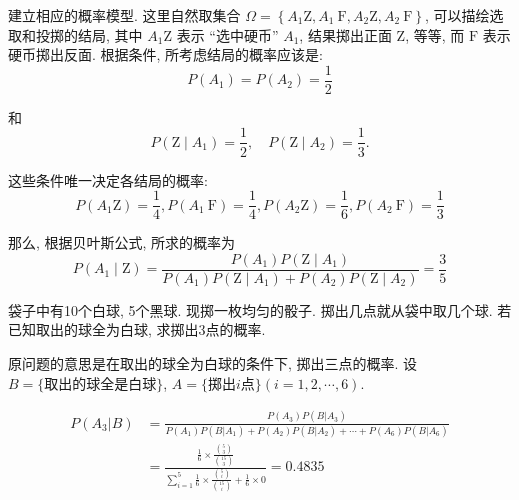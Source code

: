 \begin{solution}
    建立相应的概率模型. 这里自然取集合 $\Omega=\left\{A_1 \mathrm{Z}, A_1 \mathrm{~F}, A_2 \mathrm{Z}, A_2 \mathrm{~F}\right\}$, 可以描绘选取和投掷的结局, 其中 $A_1 \mathrm{Z}$ 表示 ``选中硬币'' $A_1$, 结果掷出正面 $\mathrm{Z}$, 等等, 而 $\mathrm{F}$ 表示硬币掷出反面. 根据条件, 所考虑结局的概率应该是:
$$
P\left(A_1\right)=P\left(A_2\right)=\frac{1}{2}
$$

和
$$
P\left(\mathrm{Z} \mid A_1\right)=\frac{1}{2}, \quad P\left(\mathrm{Z} \mid A_2\right)=\frac{1}{3} .
$$

这些条件唯一决定各结局的概率:
$$
P\left(A_1 \mathrm{Z}\right)=\frac{1}{4}, P\left(A_1 \mathrm{~F}\right)=\frac{1}{4}, P\left(A_2 \mathrm{Z}\right)=\frac{1}{6}, P\left(A_2 \mathrm{~F}\right)=\frac{1}{3}
$$

那么, 根据贝叶斯公式, 所求的概率为
$$
P\left(A_1 \mid \mathrm{Z}\right)=\frac{P\left(A_1\right) P\left(\mathrm{Z} \mid A_1\right)}{P\left(A_1\right) P\left(\mathrm{Z} \mid A_1\right)+P\left(A_2\right) P\left(\mathrm{Z} \mid A_2\right)}=\frac{3}{5}
$$
\end{solution}

\begin{exercise}
    袋子中有10个白球, 5个黑球. 现掷一枚均匀的骰子. 掷出几点就从袋中取几个球. 若已知取出的球全为白球, 求掷出3点的概率. 
\end{exercise}

\begin{solution}
    原问题的意思是在取出的球全为白球的条件下, 掷出三点的概率. 设$B=\{\text{取出的球全是白球}\}$, $A=\{\text{掷出}i\text{点}\}(i=1,2,\cdots, 6)$.

    \begin{align*}
        P(A_3 | B) &= \frac{P(A_3)P(B|A_3)}{P(A_1)P(B|A_1)+P(A_2)P(B|A_2)+\cdots+P(A_6)P(B|A_6)} \\
        &= \frac{\frac16 \times \frac{\binom 53}{\binom {15}3}}{\sum_{i=1}^5 \frac16\times \frac{\binom 5i}{\binom{15}i}+\frac16\times 0}=0.4835
    \end{align*}
\end{solution}


